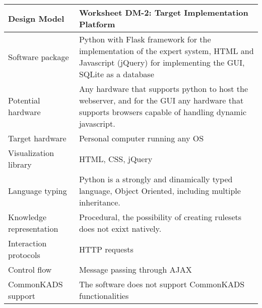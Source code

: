 \begin{tabular}%
		{|p{3cm}%
        |p{9cm}|}
\hline
\bf Design Model 	& \bf Worksheet DM-2: Target Implementation Platform \\
\hline\hline
\sc Software package & 
Python with Flask framework for the implementation of the expert system, HTML and Javascript (jQuery) for implementing the GUI, SQLite as a database
\\  \hline
\sc Potential hardware & 
Any hardware that supports python to host the webserver, and for the GUI any hardware that supports browsers capable of handling dynamic javascript.
\\ \hline
\sc Target hardware & 
Personal computer running any OS 
\\ \hline
\sc Visualization library &
HTML, CSS, jQuery 
\\ \hline
\sc Language typing &
Python is a strongly and dinamically typed language, Object Oriented, including multiple inheritance.
\\ \hline
\sc Knowledge representation & 
Procedural, the possibility of creating rulesets does not exixt natively.
\\ \hline
\sc Interaction protocols &
HTTP requests 
\\ \hline
\sc Control flow &
Message passing through AJAX
\\ \hline 
\sc CommonKADS support &
The software does not support CommonKADS functionalities
\\ \hline
\end{tabular}
